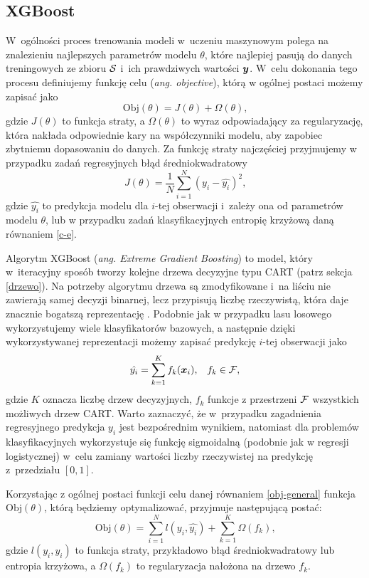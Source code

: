 \documentclass[inzynierska]{pwr_wmat_praca_dyplomowa}
\theoremstyle{plain}
\numberwithin{theorem}{chapter}
\theoremstyle{definition}
\numberwithin{theorem}{chapter}
\begin{document}
\subsection{XGBoost}
W~ogólności proces trenowania modeli w~uczeniu maszynowym polega na znalezieniu najlepszych parametrów modelu $\theta$, które najlepiej pasują do danych treningowych ze zbioru $\mathcal{S}$ i~ich prawdziwych wartości $\boldsymbol{y}$. W~celu dokonania tego procesu definiujemy funkcję celu (\textit{ang. objective}), którą w ogólnej postaci możemy zapisać jako
\begin{equation}
	\label{obj-general}
	\text{Obj}(\theta) = J(\theta) + \Omega(\theta) \text{,}
\end{equation}
gdzie $J(\theta)$ to funkcja straty, a $\Omega(\theta)$ to wyraz odpowiadający za regularyzację, która nakłada odpowiednie kary na współczynniki modelu, aby zapobiec zbytniemu dopasowaniu do danych. Za funkcję straty najczęściej przyjmujemy w przypadku zadań regresyjnych błąd średniokwadratowy
$$ J(\theta) = \frac{1}{N} \sum_{i=1}^{N} (y_i - \hat{y_i})^2 \text{,}$$
gdzie $\hat{y_i}$ to predykcja modelu dla $i$-tej obserwacji i~zależy ona od parametrów modelu $\theta$, lub w przypadku zadań klasyfikacyjnych entropię krzyżową daną równaniem \ref{c-e}.

Algorytm XGBoost (\textit{ang. Extreme Gradient Boosting}) to model, który w~iteracyjny sposób tworzy kolejne drzewa decyzyjne typu CART (patrz sekcja \ref{drzewo}). Na potrzeby algorytmu drzewa są zmodyfikowane i~na liściu nie zawierają samej decyzji binarnej, lecz przypisują liczbę rzeczywistą, która daje znacznie bogatszą reprezentację \cite{xgboost}. Podobnie jak w przypadku lasu losowego wykorzystujemy wiele klasyfikatorów bazowych, a następnie dzięki wykorzystywanej reprezentacji możemy zapisać predykcję $i$-tej obserwacji jako
$$ \hat{y_i} = \sum_{k=1}^K f_k(\boldsymbol{x}_i) \text{,} \quad f_k \in \mathcal{F} \text{,} $$
gdzie $K$ oznacza liczbę drzew decyzyjnych, $f_k$ funkcje z przestrzeni $\mathcal{F}$ wszystkich możliwych drzew CART. Warto zaznaczyć, że w~przypadku zagadnienia regresyjnego predykcja $y_i$ jest bezpośrednim wynikiem, natomiast dla problemów klasyfikacyjnych wykorzystuje się funkcję sigmoidalną (podobnie jak w regresji logistycznej) w~celu zamiany wartości liczby rzeczywistej na predykcję z~przedziału $[0,1]$.

Korzystając z ogólnej postaci funkcji celu danej równaniem \ref{obj-general} funkcja $\text{Obj}(\theta)$, którą będziemy optymalizować, przyjmuje następującą postać:
$$ \text{Obj}(\theta) = \sum_{i=1}^{N} l(y_i, \hat{y_i}) + \sum_{k=1}^{K} \Omega(f_k) \text{,} $$
gdzie $l(y_i, \hat{y_i})$ to funkcja straty, przykładowo błąd średniokwadratowy lub entropia krzyżowa, a $\Omega(f_k)$ to regularyzacja nałożona na drzewo $f_k$.
\end{document}
